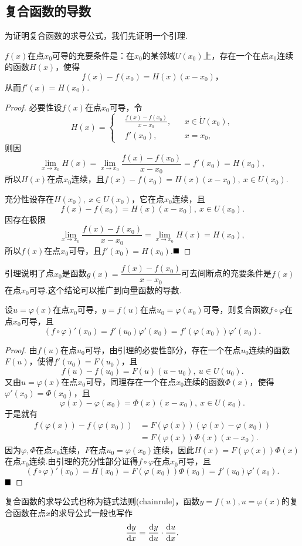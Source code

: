 \subsection{复合函数的导数}
为证明复合函数的求导公式，我们先证明一个引理.
\begin{lemma}
	$f(x)$在点$x_0$可导的充要条件是：在$x_0$的某邻域$U(x_0)$上，存在一个在点$x_0$连续的函数$H(x)$，使得
	$$f(x)-f(x_0)=H(x)(x-x_0)，$$
	从而$f'(x)=H(x_0).$
\end{lemma}
\begin{proof}
	必要性\qquad 设$f(x)$在点$x_0$可导，令
	\begin{equation*}
		H(x)=\left\{
		\begin{aligned}
			&\frac{f(x)-f(x_0)}{x-x_0}, & & x\in \mathring{U}(x_0),\\
			&f'(x_0), & & x=x_0,
		\end{aligned}
		\right.
	\end{equation*}
	则因
	$$\lim\limits_{x\to x_0}H(x)=\lim\limits_{x\to x_0}\frac{f(x)-f(x_0)}{x-x_0}=f'(x_0)=H(x_0),$$
	所以$H(x)$在点$x_0$连续，且$f(x)-f(x_0)=H(x)(x-x_0),\ x\in U(x_0).$
	
	充分性\qquad 设存在$H(x_0),\ x\in U(x_0)$，它在点$x_0$连续，且
	$$f(x)-f(x_0)=H(x)(x-x_0),\ x\in U(x_0).$$
	因存在极限
	$$\lim\limits_{x\to x_0}\frac{f(x)-f(x_0)}{x-x_0}=\lim\limits_{x\to x_0}H(x)=H(x_0),$$
	所以$f(x)$在点$x_0$可导，且$f'(x_0)=H(x_0)$.$\hfill\blacksquare$
\end{proof}
\begin{remark}
	引理说明了点$x_0$是函数$g(x)=\dfrac{f(x)-f(x_0)}{x-x_0}$可去间断点的充要条件是$f(x)$在点$x_0$可导.这个结论可以推广到向量函数的导数.
\end{remark}
\begin{theorem}
	设$u=\varphi(x)$在点$x_0$可导，$y=f(u)$在点$u_0=\varphi(x_0)$可导，则复合函数$f\circ \varphi$在点$x_0$可导，且
	$$(f\circ \varphi)'(x_0)=f'(u_0)\varphi'(x_0)=f'(\varphi(x_0))\varphi'(x_0).$$
\end{theorem}
\begin{proof}
	由$f(u)$在点$u_0$可导，由引理的必要性部分，存在一个在点$u_0$连续的函数$F(u)$，使得$f'(u_0)=F(u_0)$，且
	$$f(u)-f(u_0)=F(u)(u-u_0),\ u\in U(u_0).$$
	又由$u=\varphi(x)$在点$x_0$可导，同理存在一个在点$x_0$连续的函数$\varPhi(x)$，使得$\varphi'(x_0)=\varPhi(x_0)$，且
	$$\varphi(x)-\varphi(x_0)=\varPhi(x)(x-x_0),\ x\in U(x_0).$$
	于是就有
	\begin{align*}
		f(\varphi(x))-f(\varphi(x_0))&=F(\varphi(x))(\varphi(x)-\varphi(x_0))\\
		&=F(\varphi(x))\varPhi(x)(x-x_0).
	\end{align*}
	因为$\varphi,\varPhi$在点$x_0$连续，$F$在点$u_0=\varphi(x_0)$连续，因此$H(x)=F(\varphi(x))\varPhi(x)$在点$x_0$连续.由引理的充分性部分证得$f\circ \varphi$在点$x_0$可导，且
	$$(f\circ\varphi)'(x_0)=H(x_0)=F(\varphi(x_0))\varPhi(x_0)=f'(u_0)\varphi'(x_0).$$
	$\hfill\blacksquare$
\end{proof}
\begin{remark}
	复合函数的求导公式也称为{\heiti 链式法则}(chainrule)，函数$y=f(u),u=\varphi(x)$的复合函数在点$x$的求导公式一般也写作
	$$\frac{\odif{y}}{\odif{x}}=\frac{\odif{y}}{\odif{u}}\cdot\frac{\odif{u}}{\odif{x}}.$$
\end{remark}
